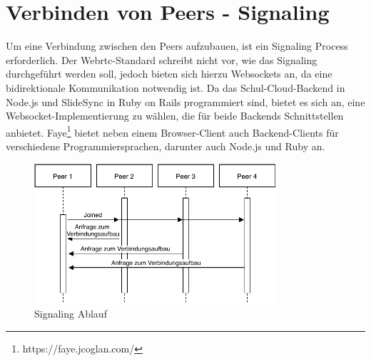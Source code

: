 
\section{Verbinden von Peers - Signaling}\label{k:signaling}
Um eine Verbindung zwischen den Peers aufzubauen, ist ein Signaling Process erforderlich. Der Webrtc-Standard schreibt nicht vor, wie das Signaling durchgeführt werden soll, jedoch bieten sich hierzu Websockets an, da eine bidirektionale Kommunikation notwendig ist. Da das Schul-Cloud-Backend in Node.js und SlideSync in Ruby on Rails programmiert sind, bietet es sich an, eine Websocket-Implementierung zu wählen, die für beide Backends Schnittstellen anbietet. Faye\footnote{https://faye.jcoglan.com/} bietet neben einem Browser-Client auch Backend-Clients für verschiedene Programmiersprachen, darunter auch Node.js und Ruby an.
\begin{figure}[!h]
	\centering
	\includegraphics[width=0.8\textwidth]{figures/Signaling}
	\caption[A Figure Short-Title]{Signaling Ablauf}
	\label{fig:mesh}
\end{figure}

